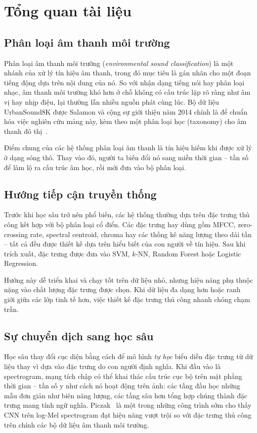\section{Tổng quan tài liệu}
\label{sec:litreview}

\subsection{Phân loại âm thanh môi trường}

Phân loại âm thanh môi trường (\textit{environmental sound classification}) là
một nhánh của xử lý tín hiệu âm thanh, trong đó mục tiêu là gán nhãn cho một đoạn
tiếng động dựa trên nội dung của nó. So với nhận dạng tiếng nói hay phân loại
nhạc, âm thanh môi trường khó hơn ở chỗ không có cấu trúc lặp rõ ràng như âm vị
hay nhịp điệu, lại thường lẫn nhiều nguồn phát cùng lúc. Bộ dữ liệu UrbanSound8K
được Salamon và cộng sự giới thiệu năm 2014 chính là để chuẩn hóa việc nghiên cứu
mảng này, kèm theo một phân loại học (taxonomy) cho âm thanh đô thị~\cite{salamon2014}.

Điểm chung của các hệ thống phân loại âm thanh là tín hiệu hiếm khi được xử lý ở
dạng sóng thô. Thay vào đó, người ta biến đổi nó sang miền thời gian -- tần số để
làm lộ ra cấu trúc âm học, rồi mới đưa vào bộ phân loại.

\subsection{Hướng tiếp cận truyền thống}

Trước khi học sâu trở nên phổ biến, các hệ thống thường dựa trên đặc trưng thủ
công kết hợp với bộ phân loại cổ điển. Các đặc trưng hay dùng gồm MFCC,
zero-crossing rate, spectral centroid, chroma hay các thống kê năng lượng theo
dải tần -- tất cả đều được thiết kế dựa trên hiểu biết của con người về tín hiệu.
Sau khi trích xuất, đặc trưng được đưa vào SVM, $k$-NN, Random Forest hoặc
Logistic Regression.

Hướng này dễ triển khai và chạy tốt trên dữ liệu nhỏ, nhưng hiệu năng phụ thuộc
nặng vào chất lượng đặc trưng được chọn. Khi dữ liệu đa dạng hơn hoặc ranh giới
giữa các lớp tinh tế hơn, việc thiết kế đặc trưng thủ công nhanh chóng chạm trần.

\subsection{Sự chuyển dịch sang học sâu}

Học sâu thay đổi cục diện bằng cách để mô hình \textit{tự học} biểu diễn đặc
trưng từ dữ liệu thay vì dựa vào đặc trưng do con người định nghĩa. Khi đầu vào
là spectrogram, mạng tích chập có thể khai thác cấu trúc cục bộ trên mặt phẳng
thời gian -- tần số y như cách nó hoạt động trên ảnh: các tầng đầu học những mẫu
đơn giản như biên năng lượng, các tầng sâu hơn tổng hợp chúng thành đặc trưng
mang tính ngữ nghĩa. Piczak~\cite{piczak2015} là một trong những công trình sớm
cho thấy CNN trên log-Mel spectrogram đạt hiệu năng vượt trội so với đặc trưng
thủ công trên chính các bộ dữ liệu âm thanh môi trường.

